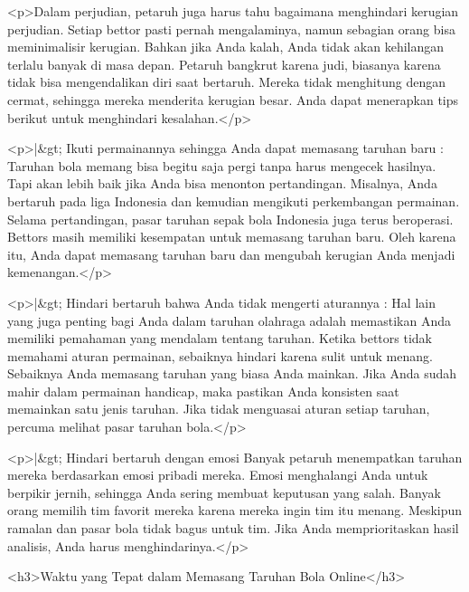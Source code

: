 <p>Dalam perjudian, petaruh juga harus tahu bagaimana menghindari kerugian perjudian. Setiap bettor pasti pernah mengalaminya, namun sebagian orang bisa meminimalisir kerugian. Bahkan jika Anda kalah, Anda tidak akan kehilangan terlalu banyak di masa depan. Petaruh bangkrut karena judi, biasanya karena tidak bisa mengendalikan diri saat bertaruh. Mereka tidak menghitung dengan cermat, sehingga mereka menderita kerugian besar. Anda dapat menerapkan tips berikut untuk menghindari kesalahan.</p>



<p>|&gt; Ikuti permainannya sehingga Anda dapat memasang taruhan baru : Taruhan bola memang bisa begitu saja pergi tanpa harus mengecek hasilnya. Tapi akan lebih baik jika Anda bisa menonton pertandingan. Misalnya, Anda bertaruh pada liga Indonesia dan kemudian mengikuti perkembangan permainan. Selama pertandingan, pasar taruhan sepak bola Indonesia juga terus beroperasi. Bettors masih memiliki kesempatan untuk memasang taruhan baru. Oleh karena itu, Anda dapat memasang taruhan baru dan mengubah kerugian Anda menjadi kemenangan.</p>



<p>|&gt; Hindari bertaruh bahwa Anda tidak mengerti aturannya : Hal lain yang juga penting bagi Anda dalam taruhan olahraga adalah memastikan Anda memiliki pemahaman yang mendalam tentang taruhan. Ketika bettors tidak memahami aturan permainan, sebaiknya hindari karena sulit untuk menang. Sebaiknya Anda memasang taruhan yang biasa Anda mainkan. Jika Anda sudah mahir dalam permainan handicap, maka pastikan Anda konsisten saat memainkan satu jenis taruhan. Jika tidak menguasai aturan setiap taruhan, percuma melihat pasar taruhan bola.</p>



<p>|&gt; Hindari bertaruh dengan emosi Banyak petaruh menempatkan taruhan mereka berdasarkan emosi pribadi mereka. Emosi menghalangi Anda untuk berpikir jernih, sehingga Anda sering membuat keputusan yang salah. Banyak orang memilih tim favorit mereka karena mereka ingin tim itu menang. Meskipun ramalan dan pasar bola tidak bagus untuk tim. Jika Anda memprioritaskan hasil analisis, Anda harus menghindarinya.</p>



<h3>Waktu yang Tepat dalam Memasang Taruhan Bola Online</h3>



